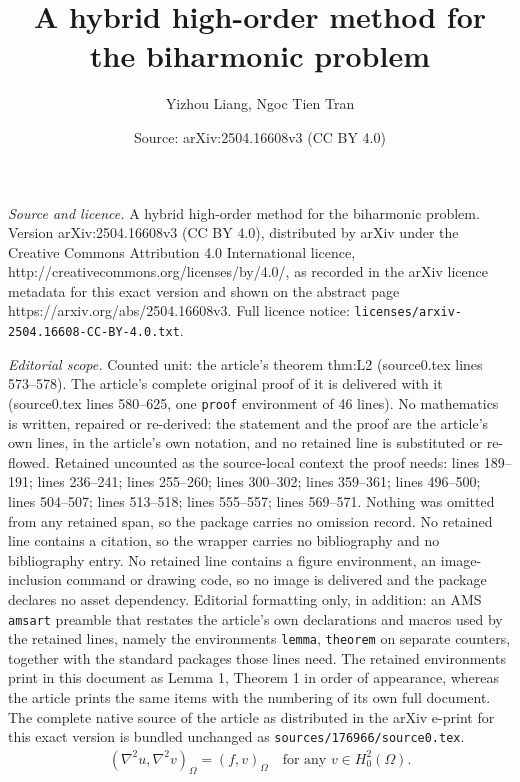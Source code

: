 \documentclass[10pt,a4paper]{amsart}
\title{A hybrid high-order method for the biharmonic problem}
\author{Yizhou Liang, Ngoc Tien Tran}
\date{Source: arXiv:2504.16608v3 (CC BY 4.0)}
\begin{document}
\maketitle

\noindent\emph{Source and licence.} A hybrid high-order method for the biharmonic problem. Version arXiv:2504.16608v3 (CC BY 4.0), distributed by arXiv under the Creative Commons Attribution 4.0 International licence, http://creativecommons.org/licenses/by/4.0/, as recorded in the arXiv licence metadata for this exact version and shown on the abstract page https://arxiv.org/abs/2504.16608v3. Full licence notice: \texttt{licenses/arxiv-2504.16608-CC-BY-4.0.txt}.\par\smallskip

\noindent\textit{Editorial scope.} Counted unit: the article's theorem thm:L2 (source0.tex lines 573--578). The article's complete original proof of it is delivered with it (source0.tex lines 580--625, one \texttt{proof} environment of 46 lines). No mathematics is written, repaired or re-derived: the statement and the proof are the article's own lines, in the article's own notation, and no retained line is substituted or re-flowed.  Retained uncounted as the source-local context the proof needs: lines 189--191; lines 236--241; lines 255--260; lines 300--302; lines 359--361; lines 496--500; lines 504--507; lines 513--518; lines 555--557; lines 569--571.  Nothing was omitted from any retained span, so the package carries no omission record.  No retained line contains a citation, so the wrapper carries no bibliography and no bibliography entry.  No retained line contains a figure environment, an image-inclusion command or drawing code, so no image is delivered and the package declares no asset dependency.  Editorial formatting only, in addition: an AMS \texttt{amsart} preamble that restates the article's own declarations and macros used by the retained lines, namely the environments \texttt{lemma}, \texttt{theorem} on separate counters, together with the standard packages those lines need.  The retained environments print in this document as Lemma 1, Theorem 1 in order of appearance, whereas the article prints the same items with the numbering of its own full document.  The complete native source of the article as distributed in the arXiv e-print for this exact version is bundled unchanged as \texttt{sources/176966/source0.tex}.
\begin{align}\label{def:source-problem}
    (\nabla^2 u, \nabla^2 v)_{\Omega} = (f,v)_{\Omega} \quad\text{for any } v \in H^2_0(\Omega).
\end{align}
\end{document}
